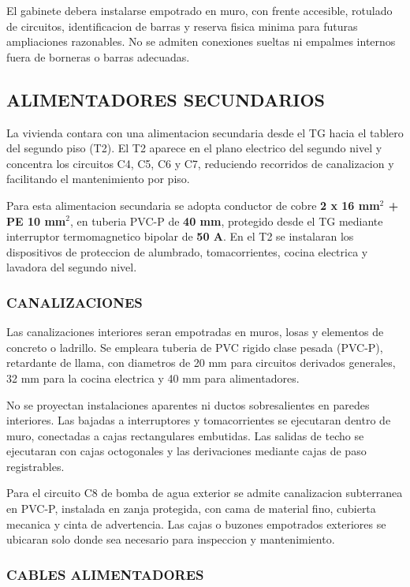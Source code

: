 El gabinete debera instalarse empotrado en muro, con frente accesible, rotulado de circuitos, identificacion de barras y reserva fisica minima para futuras ampliaciones razonables. No se admiten conexiones sueltas ni empalmes internos fuera de borneras o barras adecuadas.

\subsection{ALIMENTADORES SECUNDARIOS}

La vivienda contara con una alimentacion secundaria desde el TG hacia el tablero del segundo piso (T2). El T2 aparece en el plano electrico del segundo nivel y concentra los circuitos C4, C5, C6 y C7, reduciendo recorridos de canalizacion y facilitando el mantenimiento por piso.

Para esta alimentacion secundaria se adopta conductor de cobre \textbf{2 x 16 mm$^2$ + PE 10 mm$^2$}, en tuberia PVC-P de \textbf{40 mm}, protegido desde el TG mediante interruptor termomagnetico bipolar de \textbf{50 A}. En el T2 se instalaran los dispositivos de proteccion de alumbrado, tomacorrientes, cocina electrica y lavadora del segundo nivel.

\subsubsection{CANALIZACIONES}

Las canalizaciones interiores seran empotradas en muros, losas y elementos de concreto o ladrillo. Se empleara tuberia de PVC rigido clase pesada (PVC-P), retardante de llama, con diametros de 20 mm para circuitos derivados generales, 32 mm para la cocina electrica y 40 mm para alimentadores.

No se proyectan instalaciones aparentes ni ductos sobresalientes en paredes interiores. Las bajadas a interruptores y tomacorrientes se ejecutaran dentro de muro, conectadas a cajas rectangulares embutidas. Las salidas de techo se ejecutaran con cajas octogonales y las derivaciones mediante cajas de paso registrables.

Para el circuito C8 de bomba de agua exterior se admite canalizacion subterranea en PVC-P, instalada en zanja protegida, con cama de material fino, cubierta mecanica y cinta de advertencia. Las cajas o buzones empotrados exteriores se ubicaran solo donde sea necesario para inspeccion y mantenimiento.

\subsubsection{CABLES ALIMENTADORES}

